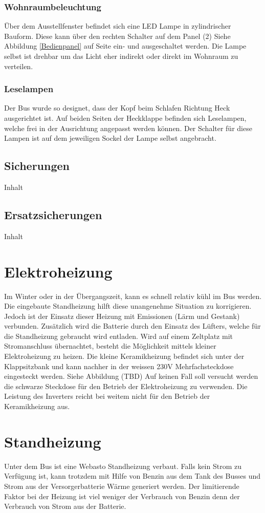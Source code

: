 \subsubsection{Wohnraumbeleuchtung}
Über dem Ausstellfenster befindet sich eine LED Lampe in zylindrischer Bauform.
Diese kann über den rechten Schalter auf dem Panel (2) Siehe Abbildung \ref{Bedienpanel} auf Seite \pageref{Bedienpanel} ein- und ausgeschaltet werden. 
Die Lampe selbst ist drehbar um das Licht eher indirekt oder direkt im Wohnraum zu verteilen.

\subsubsection{Leselampen}
Der Bus wurde so designet, dass der Kopf beim Schlafen Richtung Heck ausgerichtet ist.
Auf beiden Seiten der Heckklappe befinden sich Leselampen, welche frei in der Ausrichtung angepasst werden können.
Der Schalter für diese Lampen ist auf dem jeweiligen Sockel der Lampe selbst angebracht.
\subsection{Sicherungen}
Inhalt
\subsection{Ersatzsicherungen}
Inhalt
\section{Elektroheizung}
Im Winter oder in der Übergangszeit, kann es schnell relativ kühl im Bus werden. 
Die eingebaute Standheizung hilft diese unangenehme Situation zu korrigieren. 
Jedoch ist der Einsatz dieser Heizung mit Emissionen (Lärm und Gestank) verbunden.
Zusätzlich wird die Batterie durch den Einsatz des Lüfters, welche für die Standheizung gebraucht wird entladen.
Wird auf einem Zeltplatz mit Stromanschluss übernachtet, besteht die Möglichkeit mittels kleiner Elektroheizung zu heizen.
Die kleine Keramikheizung befindet sich unter der Klappsitzbank und kann nachher in der weissen 230V Mehrfachsteckdose eingesteckt werden. Siehe Abbildung (TBD)
Auf keinen Fall soll versucht werden die schwarze Steckdose für den Betrieb der Elektroheizung zu verwenden.
Die Leistung des Inverters reicht bei weitem nicht für den Betrieb der Keramikheizung aus.

\section{Standheizung}
Unter dem Bus ist eine Webasto Standheizung verbaut.
Falls kein Strom zu Verfügung ist, kann trotzdem mit Hilfe von Benzin aus dem Tank des Busses und Strom aus der Versorgerbatterie Wärme generiert werden.
Der limitierende Faktor bei der Heizung ist viel weniger der Verbrauch von Benzin denn der Verbrauch von Strom aus der Batterie.

